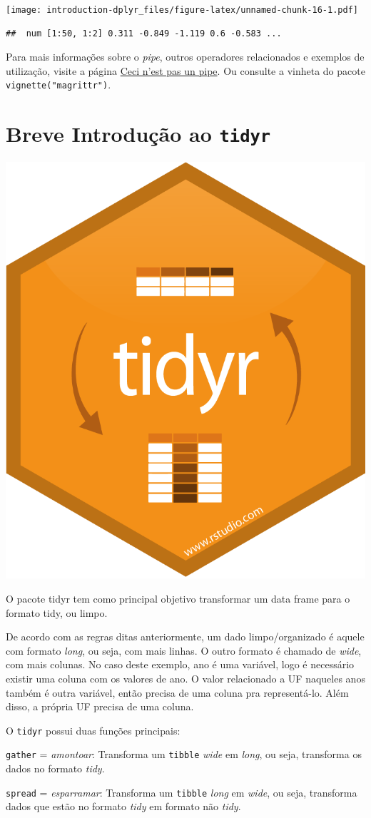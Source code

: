 \documentclass[]{book}
\begin{document}
\texttt{[image: introduction-dplyr\_files/figure-latex/unnamed-chunk-16-1.pdf]}

\begin{verbatim}
##  num [1:50, 1:2] 0.311 -0.849 -1.119 0.6 -0.583 ...
\end{verbatim}

Para mais informações sobre o \emph{pipe}, outros operadores relacionados e exemplos de utilização, visite a página \href{https://cran.r-project.org/web/packages/magrittr/vignettes/magrittr.html}{Ceci n'est pas un pipe}. Ou consulte a vinheta do pacote \texttt{vignette("magrittr")}.

\hypertarget{breve-introduuxe7uxe3o-ao-tidyr}{%
\section{\texorpdfstring{Breve Introdução ao \texttt{tidyr}}{Breve Introdução ao tidyr}}\label{breve-introduuxe7uxe3o-ao-tidyr}}

\begin{center}\includegraphics[width=0.25\linewidth]{imagens/tidyr} \end{center}

O pacote tidyr tem como principal objetivo transformar um data frame para o formato tidy, ou limpo.

De acordo com as regras ditas anteriormente, um dado limpo/organizado é aquele com formato \emph{long}, ou seja, com mais linhas. O outro formato é chamado de \emph{wide}, com mais colunas. No caso deste exemplo, ano é uma variável, logo é necessário existir uma coluna com os valores de ano. O valor relacionado a UF naqueles anos também é outra variável, então precisa de uma coluna pra representá-lo. Além disso, a própria UF precisa de uma coluna.

O \texttt{tidyr} possui duas funções principais:

\texttt{gather} = \emph{amontoar}: Transforma um \texttt{tibble} \emph{wide} em \emph{long}, ou seja, transforma os dados no formato \emph{tidy}.

\texttt{spread} = \emph{esparramar}: Transforma um \texttt{tibble} \emph{long} em \emph{wide}, ou seja, transforma dados que estão no formato \emph{tidy} em formato não \emph{tidy}.
\end{document}
